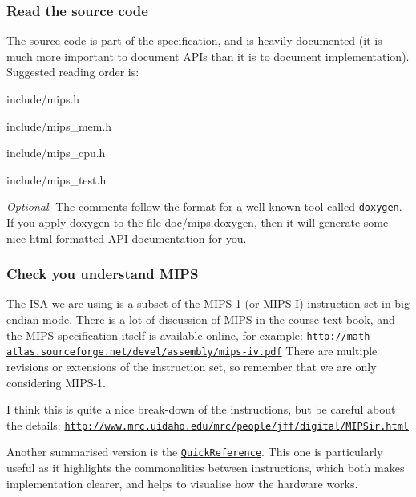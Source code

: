 \subsubsection*{Read the source code}

The source code is part of the specification, and is heavily documented (it is much more important to document A\+P\+Is than it is to document implementation). Suggested reading order is\+:


\begin{DoxyItemize}
\item {\ttfamily include/mips.\+h}
\item {\ttfamily include/mips\+\_\+mem.\+h}
\item {\ttfamily include/mips\+\_\+cpu.\+h}
\item {\ttfamily include/mips\+\_\+test.\+h}
\end{DoxyItemize}

{\itshape Optional}\+: The comments follow the format for a well-\/known tool called \href{http://www.stack.nl/~dimitri/doxygen/}{\tt doxygen}. If you apply doxygen to the file {\ttfamily doc/mips.\+doxygen}, then it will generate some nice html formatted A\+P\+I documentation for you.

\subsubsection*{Check you understand M\+I\+P\+S}

The I\+S\+A we are using is a subset of the M\+I\+P\+S-\/1 (or M\+I\+P\+S-\/\+I) instruction set in big endian mode. There is a lot of discussion of M\+I\+P\+S in the course text book, and the M\+I\+P\+S specification itself is available online, for example\+: \href{http://math-atlas.sourceforge.net/devel/assembly/mips-iv.pdf}{\tt http\+://math-\/atlas.\+sourceforge.\+net/devel/assembly/mips-\/iv.\+pdf} There are multiple revisions or extensions of the instruction set, so remember that we are only considering M\+I\+P\+S-\/1.

I think this is quite a nice break-\/down of the instructions, but be careful about the details\+: \href{http://www.mrc.uidaho.edu/mrc/people/jff/digital/MIPSir.html}{\tt http\+://www.\+mrc.\+uidaho.\+edu/mrc/people/jff/digital/\+M\+I\+P\+Sir.\+html}

Another summarised version is the \href{https://www.lri.fr/~de/MIPS.pdf}{\tt Quick\+Reference}. This one is particularly useful as it highlights the commonalities between instructions, which both makes implementation clearer, and helps to visualise how the hardware works.

